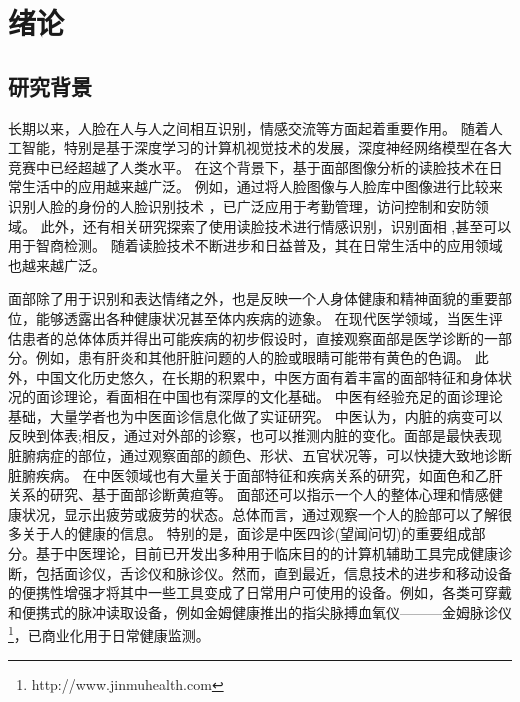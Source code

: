 \chapter{绪论}

\section{研究背景}

长期以来，人脸在人与人之间相互识别，情感交流等方面起着重要作用。
随着人工智能，特别是基于深度学习的计算机视觉技术的发展，深度神经网络模型在各大竞赛中已经超越了人类水平\cite{he2015delving}。
在这个背景下，基于面部图像分析的读脸技术在日常生活中的应用越来越广泛。
例如，通过将人脸图像与人脸库中图像进行比较来识别人脸的身份的人脸识别技术 \cite{Zhang2016Joint}\cite{Schroff2015FaceNet}，已广泛应用于考勤管理\cite{surekha2017attendance}，访问控制\cite{atick2000continuous}和安防领域\cite{liu2005ibotguard}。
此外，还有相关研究探索了使用读脸技术进行情感识别\cite{corneanu2016survey}，识别面相 \cite{Li2007Online}\cite{Tempark2012Chinese},甚至可以用于智商检测\cite{Kleisner2014Perceived}。
随着读脸技术不断进步和日益普及，其在日常生活中的应用领域也越来越广泛。

面部除了用于识别和表达情绪之外，也是反映一个人身体健康和精神面貌的重要部位，能够透露出各种健康状况甚至体内疾病的迹象。
在现代医学领域，当医生评估患者的总体体质并得出可能疾病的初步假设时，直接观察面部是医学诊断的一部分\cite{Clifford2006Shortliffe}。例如，患有肝炎和其他肝脏问题的人的脸或眼睛可能带有黄色的色调\cite{Li2008Therapeutic}。
此外，中国文化历史悠久，在长期的积累中，中医方面有着丰富的面部特征和身体状况的面诊理论，看面相在中国也有深厚的文化基础。
中医有经验充足的面诊理论基础，大量学者也为中医面诊信息化做了实证研究。
中医认为，内脏的病变可以反映到体表;相反，通过对外部的诊察，也可以推测内脏的变化\cite{杨淑芳2002伤寒六经辨证初探}。面部是最快表现脏腑病症的部位，通过观察面部的颜色、形状、五官状况等，可以快捷大致地诊断脏腑疾病。
在中医领域也有大量关于面部特征和疾病关系的研究，如面色和乙肝关系的研究\cite{杨宏志2007慢性乙型肝炎肝硬化中医面部五色诊断与临床病理的相关性研究}、基于面部诊断黄疸\cite{艾英1998黄疸病人面部色泽定量实验研究}等。
面部还可以指示一个人的整体心理和情感健康状况，显示出疲劳或疲劳的状态。总体而言，通过观察一个人的脸部可以了解很多关于人的健康的信息。
特别的是，面诊是中医四诊(望闻问切)的重要组成部分。基于中医理论，目前已开发出多种用于临床目的的计算机辅助工具完成健康诊断，包括面诊仪\cite{Liu2014Computerized}，舌诊仪\cite{Wang2004An}和脉诊仪\cite{Shu2007Developing}。然而，直到最近，信息技术的进步和移动设备的便携性增强才将其中一些工具变成了日常用户可使用的设备。例如，各类可穿戴和便携式的脉冲读取设备，例如金姆健康推出的指尖脉搏血氧仪———金姆脉诊仪\footnote{http://www.jinmuhealth.com}，已商业化用于日常健康监测。

